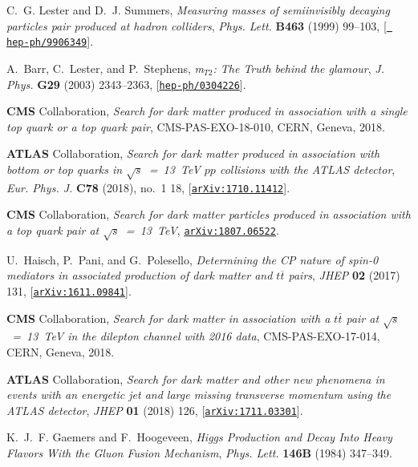 \documentclass[a4paper, 11pt,notoc]{article}
\begin{document}
\begin{thebibliography}{100}
C.~G. Lester and D.~J. Summers, {\it {Measuring masses of semiinvisibly
  decaying particles pair produced at hadron colliders}},  {\em Phys. Lett.}
  {\bf B463} (1999) 99--103, [\href{http://arxiv.org/abs/hep-ph/9906349}{{\tt
  hep-ph/9906349}}].

A.~Barr, C.~Lester, and P.~Stephens, {\it {m$_{T2}$: The Truth behind the
  glamour}},  {\em J. Phys.} {\bf G29} (2003) 2343--2363,
  [\href{http://arxiv.org/abs/hep-ph/0304226}{{\tt hep-ph/0304226}}].

{\bf CMS} Collaboration, {\it {Search for dark matter produced in association
  with a single top quark or a top quark pair}},  
  CMS-PAS-EXO-18-010, CERN, Geneva, 2018.

{\bf ATLAS} Collaboration, {\it {Search for dark matter
  produced in association with bottom or top quarks in $\sqrt{s}$~=~13~TeV $pp$
  collisions with the ATLAS detector}},  {\em Eur. Phys. J.} {\bf C78} (2018),
  no.~1 18, [\href{http://arxiv.org/abs/1710.11412}{{\tt arXiv:1710.11412}}].

{\bf CMS} Collaboration, {\it {Search for dark matter
  particles produced in association with a top quark pair at $\sqrt{s}$~=~13~TeV}},  
  \href{http://arxiv.org/abs/1807.06522}{{\tt arXiv:1807.06522}}.

U.~Haisch, P.~Pani, and G.~Polesello, {\it {Determining the CP nature of spin-0
  mediators in associated production of dark matter and $ t\overline{t} $
  pairs}},  {\em JHEP} {\bf 02} (2017) 131,
  [\href{http://arxiv.org/abs/1611.09841}{{\tt arXiv:1611.09841}}].

{\bf CMS} Collaboration, {\it {Search for dark matter in association with a $t
  \bar t$ pair at $\sqrt{s}$~=~13~TeV in the dilepton channel with 2016
  data}}, CMS-PAS-EXO-17-014, CERN, Geneva, 2018.

{\bf ATLAS} Collaboration, {\it {Search for dark matter and
  other new phenomena in events with an energetic jet and large missing
  transverse momentum using the ATLAS detector}},  {\em JHEP} {\bf 01} (2018)
  126, [\href{http://arxiv.org/abs/1711.03301}{{\tt arXiv:1711.03301}}].

K.~J.~F. Gaemers and F.~Hoogeveen, {\it {Higgs Production and Decay Into Heavy
  Flavors With the Gluon Fusion Mechanism}},  {\em Phys. Lett.} {\bf 146B}
  (1984) 347--349.


\end{thebibliography}
\end{document}
